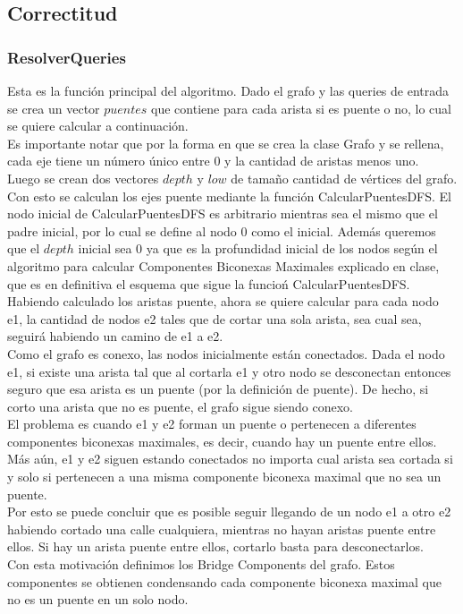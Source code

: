 \subsection{Correctitud}

\subsubsection*{ResolverQueries}
Esta es la función principal del algoritmo. Dado el grafo y las queries de entrada se crea un vector $puentes$ 
que contiene para cada arista si es puente o no, lo cual se quiere calcular a continuaci\'on. \\
Es importante notar que por la forma en que se crea la clase Grafo y se rellena, cada eje tiene un número 
único entre 0 y la cantidad de aristas menos uno. \\
Luego se crean dos vectores $depth$ y $low$ de tamaño cantidad de vértices del grafo. Con esto se calculan los
ejes puente mediante la funci\'on CalcularPuentesDFS. El nodo inicial de CalcularPuentesDFS es arbitrario 
mientras sea el mismo que el padre inicial, por lo cual se define al nodo 0 como el inicial. Además queremos 
que el $depth$ inicial sea 0 ya que es la profundidad inicial de los nodos según el algoritmo para calcular 
Componentes Biconexas Maximales explicado en clase, que es en definitiva el esquema que sigue la funcio\'n 
CalcularPuentesDFS. \\
Habiendo calculado los aristas puente, ahora se quiere calcular para cada nodo e1, la cantidad de nodos e2 
tales que de cortar una sola arista, sea cual sea, seguir\'a habiendo un camino de e1 a e2. \\
Como el grafo es conexo, las nodos inicialmente están conectados. Dada el nodo e1, si existe una arista tal que al 
cortarla e1 y otro nodo se desconectan entonces seguro que esa arista es un puente (por la definición de puente). 
De hecho, si corto una arista que no es puente, el grafo sigue siendo conexo. \\
El problema es cuando e1 y e2 forman un puente o pertenecen a diferentes componentes biconexas maximales, es decir, 
cuando hay un puente entre ellos. Más aún, e1 y e2 siguen estando conectados no importa cual arista sea cortada
si y solo si pertenecen a una misma componente biconexa maximal que no sea un puente. \\
Por esto se puede concluir que es posible seguir llegando de un nodo e1 a otro e2 habiendo cortado una calle 
cualquiera, mientras no hayan aristas puente entre ellos. Si hay un arista puente entre ellos, cortarlo basta para desconectarlos. \\
Con esta motivación definimos los Bridge Components del grafo. Estos componentes se obtienen condensando cada componente biconexa 
maximal que no es un puente en un solo nodo. \\

